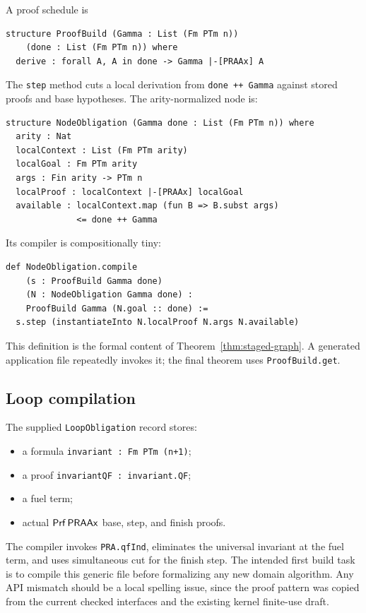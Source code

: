 A proof schedule is
\begin{lstlisting}[language={}]
structure ProofBuild (Gamma : List (Fm PTm n))
    (done : List (Fm PTm n)) where
  derive : forall A, A in done -> Gamma |-[PRAAx] A
\end{lstlisting}
The \texttt{step} method cuts a local derivation from \texttt{done ++ Gamma} against stored proofs and base
hypotheses.  The arity-normalized node is:
\begin{lstlisting}[language={}]
structure NodeObligation (Gamma done : List (Fm PTm n)) where
  arity : Nat
  localContext : List (Fm PTm arity)
  localGoal : Fm PTm arity
  args : Fin arity -> PTm n
  localProof : localContext |-[PRAAx] localGoal
  available : localContext.map (fun B => B.subst args)
              <= done ++ Gamma
\end{lstlisting}
Its compiler is compositionally tiny:
\begin{lstlisting}[language={}]
def NodeObligation.compile
    (s : ProofBuild Gamma done)
    (N : NodeObligation Gamma done) :
    ProofBuild Gamma (N.goal :: done) :=
  s.step (instantiateInto N.localProof N.args N.available)
\end{lstlisting}
This definition is the formal content of Theorem~\ref{thm:staged-graph}.  A generated application file
repeatedly invokes it; the final theorem uses \texttt{ProofBuild.get}.

\subsection{Loop compilation}

The supplied \texttt{LoopObligation} record stores:
\begin{itemize}
  \item a formula \texttt{invariant : Fm PTm (n+1)};
  \item a proof \texttt{invariantQF : invariant.QF};
  \item a fuel term;
  \item actual \(\mathsf{Prf}\,\mathsf{PRAAx}\) base, step, and finish proofs.
\end{itemize}
The compiler invokes \texttt{PRA.qfInd}, eliminates the universal invariant at the fuel term, and uses
simultaneous cut for the finish step.  The intended first build task is to compile this generic file before
formalizing any new domain algorithm.  Any API mismatch should be a local spelling issue, since the proof
pattern was copied from the current checked interfaces and the existing kernel finite-use draft.

